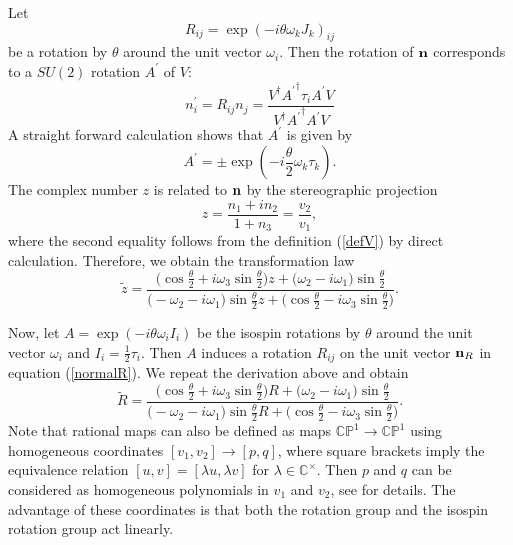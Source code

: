\documentclass[a4paper,12pt]{article}
\begin{document}
Let
%
\begin{equation}
R_{ij} = \exp\left(-i \theta \omega_k J_k \right)_{ij}
\end{equation}
%
be a rotation by $\theta$ around the unit vector $\omega_i$. Then the 
rotation of ${\bf n}$ corresponds to a $SU(2)$ rotation $A^\prime$ of $V$: 
%
\begin{equation}
n_i^\prime = R_{ij} n_j 
= \frac{V^\dagger {A^\prime}^\dagger \tau_i A^\prime V}{V^\dagger 
{A^\prime}^\dagger A^\prime V} 
\end{equation}
%
A straight forward calculation shows that $A^\prime$ is given by
%
\begin{equation}
A^\prime = \pm \exp\left(-i \frac{\theta}{2} \omega_k \tau_k \right).
\end{equation}
%
The complex number $z$ is related to ${\bf n}$ by the stereographic 
projection
%
\begin{equation}
z = \frac{n_1 + i n_2}{1+n_3} = \frac{v_2}{v_1},
\end{equation}
%
where the second equality follows from the definition (\ref{defV}) by 
direct calculation. Therefore, we obtain the transformation law 
%
\begin{equation}
{\tilde z} = \frac{\big( \cos \frac{\theta}{2} + i \omega_3 \sin
\frac{\theta}{2} \big) z + \big(\omega_2 - i \omega_1 \big) \sin
\frac{\theta}{2}} 
{\big(-\omega_2 - i \omega_1 \big) \sin
\frac{\theta}{2} z +\big( \cos \frac{\theta}{2} - i \omega_3 \sin
\frac{\theta}{2} \big)}.
\end{equation}
%

Now, let $A=\exp(-i \theta \omega_i I_i)$ be the isospin rotations by 
$\theta$ around  the unit vector $\omega_i$ and $I_i = \frac{1}{2} 
\tau_i$. Then $A$ induces a rotation $R_{ij}$ on the unit vector ${\bf 
n}_R$ in equation (\ref{normalR}). We repeat the derivation 
above and obtain
%
\begin{equation}
{\tilde R} = \frac{\big( \cos \frac{\theta}{2} + i \omega_3 \sin
\frac{\theta}{2} \big) R   + \big(\omega_2 - i \omega_1 \big) \sin
\frac{\theta}{2}} 
{\big(- \omega_2 - i \omega_1 \big) \sin
\frac{\theta}{2} R +\big( \cos \frac{\theta}{2} - i \omega_3 \sin
\frac{\theta}{2} \big)}.
\end{equation}
%
Note that rational maps can also be defined as maps $\mathbb{CP}^1 \to 
\mathbb{CP}^1$ using homogeneous coordinates $[v_1,v_2] \to [p,q]$, 
where square 
brackets imply the equivalence relation $[u,v] = [\lambda u, \lambda v]$ 
for $\lambda \in {\mathbb C}^\times$. Then $p$ and $q$ can be considered as 
homogeneous polynomials in $v_1$ and $v_2$, see \cite{Houghton:1998kg, 
Houghton:2001fe} for details.
The advantage of these coordinates is that both the 
rotation group and the isospin rotation group act linearly.
\end{document}
